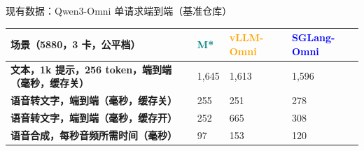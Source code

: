 \begin{frame}[t]{现有数据：Qwen3-Omni 单请求端到端（基准仓库）}
\scriptsize
\renewcommand{\arraystretch}{1.12}
\setlength{\tabcolsep}{3pt}
\begin{tabularx}{\textwidth}{>{\bfseries}p{3.4cm} Y Y Y}
\toprule
{}
场景（5880，3 卡，公平档） & \textcolor{Teal}{M*} & \textcolor{Orange}{vLLM-Omni} & \textcolor{Blue}{SGLang-Omni} \\
\midrule
文本，1k 提示，256 token，端到端（毫秒，缓存关） & 1,645 & 1,613 & 1,596 \\
语音转文字，端到端（毫秒，缓存关） & 255 & 251 & 278 \\
语音转文字，端到端（毫秒，缓存开） & 252 & 665 & 308 \\
语音合成，每秒音频所需时间（毫秒） & 97 & 153 & 120 \\
\bottomrule
\end{tabularx}
\par{}
\par{}
\end{frame}
